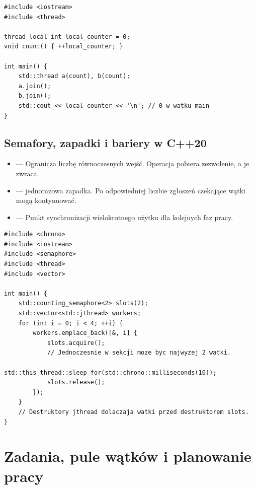 \begin{lstlisting}[caption={Pamięć lokalna dla każdego wątku (C++11).}]
#include <iostream>
#include <thread>

thread_local int local_counter = 0;
void count() { ++local_counter; }

int main() {
    std::thread a(count), b(count);
    a.join();
    b.join();
    std::cout << local_counter << '\n'; // 0 w watku main
}
\end{lstlisting}

\subsection{Semafory, zapadki i bariery w C++20}

\begin{itemize}
\item {} ---
Ogranicza liczbę równoczesnych wejść. Operacja 
pobiera zezwolenie, a  je zwraca.
\item {} --- jednorazowa zapadka. Po odpowiedniej liczbie zgłoszeń
 czekające wątki mogą kontynuować.
\item {} ---
Punkt synchronizacji wielokrotnego użytku dla kolejnych faz pracy.
\end{itemize}

\begin{lstlisting}[caption={Semafor dopuszcza maksymalnie dwa zadania naraz (C++20).}]
#include <chrono>
#include <iostream>
#include <semaphore>
#include <thread>
#include <vector>

int main() {
    std::counting_semaphore<2> slots(2);
    std::vector<std::jthread> workers;
    for (int i = 0; i < 4; ++i) {
        workers.emplace_back([&, i] {
            slots.acquire();
            // Jednoczesnie w sekcji moze byc najwyzej 2 watki.
            std::this_thread::sleep_for(std::chrono::milliseconds(10));
            slots.release();
        });
    }
    // Destruktory jthread dolaczaja watki przed destruktorem slots.
}
\end{lstlisting}


\section{Zadania, pule wątków i planowanie pracy}
\label{sec:thread-pool}

